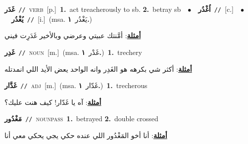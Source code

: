 \documentclass[10pt,a4paper,twoside]{article} %
\begin{document}
\begin{multicols}{2}
{\setlength\topsep{0pt}\textbf{\foreignlanguage{arabic}{غَدَر}}\ {\color{gray}\texttt{//}\color{black}}\ \textsc{verb}\ [p.]\ \textbf{1.}~act treacherously to sb.  \textbf{2.}~betray sb\ \ $\bullet$\ \ \setlength\topsep{0pt}\textbf{\foreignlanguage{arabic}{اُغْدُر}}\ {\color{gray}\texttt{//}\color{black}}\ [c.]\ \ $\bullet$\ \ \setlength\topsep{0pt}\textbf{\foreignlanguage{arabic}{يُغْدُر}}\ {\color{gray}\texttt{//}\color{black}}\ [i.]\ \color{gray}(msa. \foreignlanguage{arabic}{يَغْدُر}~\foreignlanguage{arabic}{\textbf{١.}})\color{black}\  \begin{flushright}\color{gray}\foreignlanguage{arabic}{\textbf{\underline{\foreignlanguage{arabic}{أمثلة}}}: أمَّنتك عبيتي وعرضي وبالأخير غَدَرِت فيني}\end{flushright}\color{black}} \vspace{2mm}

{\setlength\topsep{0pt}\textbf{\foreignlanguage{arabic}{غَدِر}}\ {\color{gray}\texttt{//}\color{black}}\ \textsc{noun}\ [m.]\ \color{gray}(msa. \foreignlanguage{arabic}{غَدْر}~\foreignlanguage{arabic}{\textbf{١.}})\color{black}\ \textbf{1.}~trechery\  \begin{flushright}\color{gray}\foreignlanguage{arabic}{\textbf{\underline{\foreignlanguage{arabic}{أمثلة}}}: أكثر شي بكرهه هو الغَدِر وانه الواحد يعض الأيد اللي انمدتله}\end{flushright}\color{black}} \vspace{2mm}

{\setlength\topsep{0pt}\textbf{\foreignlanguage{arabic}{غَدَّار}}\ {\color{gray}\texttt{//}\color{black}}\ \textsc{adj}\ [m.]\ \color{gray}(msa. \foreignlanguage{arabic}{غَدّار}~\foreignlanguage{arabic}{\textbf{١.}})\color{black}\ \textbf{1.}~trecherous\  \begin{flushright}\color{gray}\foreignlanguage{arabic}{\textbf{\underline{\foreignlanguage{arabic}{أمثلة}}}: آه يا غَدّار! كيف هنت عليك؟}\end{flushright}\color{black}} \vspace{2mm}

{\setlength\topsep{0pt}\textbf{\foreignlanguage{arabic}{مَغْدُور}}\ {\color{gray}\texttt{//}\color{black}}\ \textsc{noun\textunderscore pass}\ \textbf{1.}~betrayed  \textbf{2.}~double crossed\  \begin{flushright}\color{gray}\foreignlanguage{arabic}{\textbf{\underline{\foreignlanguage{arabic}{أمثلة}}}: أنا أخو المَغْدُور اللي عنده حكي يجي يحكي معي أنا}\end{flushright}\color{black}} \vspace{2mm}


\end{multicols}
\end{document}

